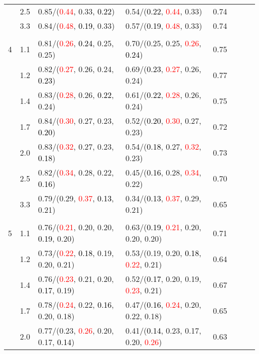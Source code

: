 \documentclass[10pt,a4paper]{report}
\begin{document}
\begin{table}[!htbp]
\begin{center}
{\begin{tabular}{ccllcccc}
			&2.5&0.85/(\textcolor{red}{0.44}, 0.33, \textcolor{black}{0.22})&0.54/(\textcolor{black}{0.22}, \textcolor{red}{0.44}, 0.33)&0.74\\
			&3.3&0.84/(\textcolor{red}{0.48}, \textcolor{black}{0.19}, 0.33)&0.57/(\textcolor{black}{0.19}, \textcolor{red}{0.48}, 0.33)&0.74\\
			&&&&\\
			4			&1.1&0.81/(\textcolor{red}{0.26}, \textcolor{black}{0.24}, 0.25, 0.25)&0.70/(0.25, 0.25, \textcolor{red}{0.26}, \textcolor{black}{0.24})&0.75\\
			&1.2&0.82/(\textcolor{red}{0.27}, 0.26, 0.24, \textcolor{black}{0.23})&0.69/(\textcolor{black}{0.23}, \textcolor{red}{0.27}, 0.26, 0.24)&0.77\\
			&1.4&0.83/(\textcolor{red}{0.28}, 0.26, \textcolor{black}{0.22}, 0.24)&0.61/(\textcolor{black}{0.22}, \textcolor{red}{0.28}, 0.26, 0.24)&0.75\\
			&1.7&0.84/(\textcolor{red}{0.30}, 0.27, 0.23, \textcolor{black}{0.20})&0.52/(\textcolor{black}{0.20}, \textcolor{red}{0.30}, 0.27, 0.23)&0.72\\
			&2.0&0.83/(\textcolor{red}{0.32}, 0.27, 0.23, \textcolor{black}{0.18})&0.54/(\textcolor{black}{0.18}, 0.27, \textcolor{red}{0.32}, 0.23)&0.73\\
			&2.5&0.82/(\textcolor{red}{0.34}, 0.28, 0.22, \textcolor{black}{0.16})&0.45/(\textcolor{black}{0.16}, 0.28, \textcolor{red}{0.34}, 0.22)&0.70\\
			&3.3&0.79/(0.29, \textcolor{red}{0.37}, \textcolor{black}{0.13}, 0.21)&0.34/(\textcolor{black}{0.13}, \textcolor{red}{0.37}, 0.29, 0.21)&0.65\\
			&&&&\\
			5			&1.1&0.76/(\textcolor{red}{0.21}, 0.20, 0.20, \textcolor{black}{0.19}, 0.20)&0.63/(\textcolor{black}{0.19}, \textcolor{red}{0.21}, 0.20, 0.20, 0.20)&0.71\\
			&1.2&0.73/(\textcolor{red}{0.22}, \textcolor{black}{0.18}, 0.19, 0.20, 0.21)&0.53/(0.19, 0.20, \textcolor{black}{0.18}, \textcolor{red}{0.22}, 0.21)&0.64\\
			&1.4&0.76/(\textcolor{red}{0.23}, 0.21, 0.20, \textcolor{black}{0.17}, 0.19)&0.52/(\textcolor{black}{0.17}, 0.20, 0.19, \textcolor{red}{0.23}, 0.21)&0.67\\
			&1.7&0.78/(\textcolor{red}{0.24}, 0.22, \textcolor{black}{0.16}, 0.20, 0.18)&0.47/(\textcolor{black}{0.16}, \textcolor{red}{0.24}, 0.20, 0.22, 0.18)&0.65\\
			&2.0&0.77/(0.23, \textcolor{red}{0.26}, 0.20, 0.17, \textcolor{black}{0.14})&0.41/(\textcolor{black}{0.14}, 0.23, 0.17, 0.20, \textcolor{red}{0.26})&0.63\\

\end{tabular}}
\end{center}
\end{table}
\end{document}

